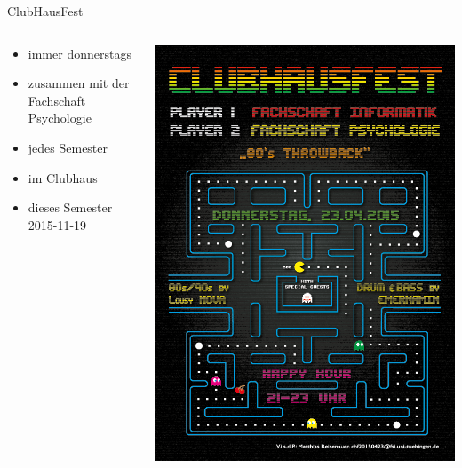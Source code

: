\documentclass{beamer}
\begin{document}
		
	\begin{frame}{ClubHausFest}
		\begin{columns}
			\begin{column}{.5\linewidth}
				\begin{itemize}
					\item immer donnerstags
					\item zusammen mit der Fachschaft Psychologie
					\item jedes Semester
					\item im Clubhaus
					\item dieses Semester 2015-11-19
				\end{itemize}
			\end{column}
			\begin{column}{.5\linewidth}
				\includegraphics[width=\linewidth]{CHF_Flyer.png}
			\end{column}
		\end{columns}
	\end{frame}
	
\end{document}
